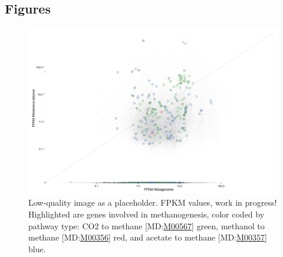 \documentclass{bmcart}
\begin{document}
\begin{backmatter}


\newpage
\section*{Figures}
\begin{figure}[h!]
\includegraphics[width=\textwidth]{Rplot}
\caption{ Low-quality image as a placeholder. FPKM values, work in progress! Highlighted are genes involved in methanogenesis, color coded by pathway type: CO2 to methane [MD:\href{http://www.kegg.jp/kegg-bin/show_module?M00567}{M00567}] green, methanol to methane [MD:\href{http://www.kegg.jp/kegg-bin/show_module?M00356}{M00356}] red, and acetate to methane [MD:\href{http://www.kegg.jp/kegg-bin/show_module?M00357}{M00357}] blue.}
\label{fCoverage}
\end{figure}
%



\end{backmatter}
\end{document}
